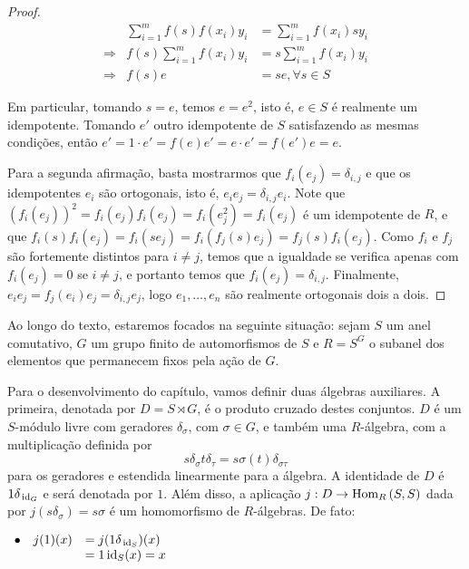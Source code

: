 \begin{lemma}
\begin{proof}
\[\begin{array}{rrl}
    & \sum_{i=1}^{m}f(s)f(x_i)y_i &= \sum_{i=1}^{m}f(x_i)sy_i \\
    \Rightarrow & f(s)\sum_{i=1}^{m}f(x_i)y_i &= s\sum_{i=1}^{m}f(x_i)y_i \\
    \Rightarrow & f(s)e &= se ,\forall s \in S
\end{array}\]

Em particular, tomando $s=e$, temos $e=e^2$, isto é, $e\in S$ é realmente um idempotente. Tomando $e'$ outro idempotente de $S$ satisfazendo as mesmas condições, então $e'=1\cdot e'=f(e)e'=e\cdot e'=f(e')e=e$.
\par Para a segunda afirmação, basta mostrarmos que $f_i(e_j)=\delta_{i,j}$ e que os idempotentes $e_i$ são ortogonais, isto é, $e_ie_j=\delta_{i,j}e_i$. Note que $\left(f_i(e_j)\right)^2 =f_i(e_j)f_i(e_j) =f_i(e_j^2)=f_i(e_j)$ é um idempotente de $R$, e que $f_i(s)f_i(e_j) = f_i(se_j) = f_i(f_j(s)e_j) = f_j(s)f_i(e_j)$. Como $f_i$ e $f_j$ são fortemente distintos para $i\neq j$, temos que a igualdade se verifica apenas com $f_i(e_j) = 0$ se $i\neq j$, e portanto temos que $f_i(e_j)=\delta_{i,j}$. Finalmente, $e_ie_j =f_j(e_i)e_j =\delta_{i,j}e_j$, logo $e_1, \dots, e_n$ são realmente ortogonais dois a dois.
\end{proof}
\end{lemma}
Ao longo do texto, estaremos focados na seguinte situação: sejam $S$ um anel comutativo, $G$ um grupo finito de automorfismos de $S$ e $R=S^G$ o subanel dos elementos que permanecem fixos pela ação de $G$. \par 
Para o desenvolvimento do capítulo, vamos definir duas álgebras auxiliares. A primeira, \label{alg:D}denotada por $D=S\rtimes G$, é o produto cruzado destes conjuntos. $D$ é um $S$-módulo livre com geradores $\delta_\sigma$, com $\sigma\in G$, e também uma $R$-álgebra, com a multiplicação definida por\[s\delta_\sigma t\delta_{\tau}=s\sigma(t)\delta_{\sigma\tau}\]para os geradores e estendida linearmente para a álgebra. A identidade de $D$ é $1\delta_{\, \textrm{id}_{G}}$ e será denotada por $1$. Além disso, a aplicação $j: D \rightarrow \textrm{Hom}_{R}\left( S,S \right)$ dada por $j(s\delta_\sigma) = s\sigma$ é um homomorfismo de $R$-álgebras. De fato:

  \vspace{0.3 cm}
  
    $\begin{array}{rrl}
         \bullet & j(1)(x) &= j(1\delta_{\, \textrm{id}_{S}})(x) \\
        & &= 1\, \textrm{id}_{S}(x) = x
    \end{array}$
    
